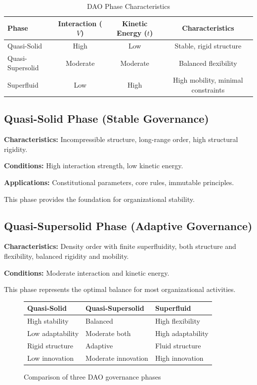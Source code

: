 \documentclass[AMA]{WileyNJD-AMA}
\begin{document}
\begin{table}[h]
\caption{DAO Phase Characteristics}
\label{tab:phases}
\centering
\begin{tabular}{lccc}
\hline
Phase & Interaction ($V$) & Kinetic Energy ($t$) & Characteristics \\
\hline
Quasi-Solid & High & Low & Stable, rigid structure \\
Quasi-Supersolid & Moderate & Moderate & Balanced flexibility \\
Superfluid & Low & High & High mobility, minimal constraints \\
\hline
\end{tabular}
\end{table}

\subsection{Quasi-Solid Phase (Stable Governance)}

\textbf{Characteristics:} Incompressible structure, long-range order, high structural rigidity.

\textbf{Conditions:} High interaction strength, low kinetic energy.

\textbf{Applications:} Constitutional parameters, core rules, immutable principles.

This phase provides the foundation for organizational stability.

\subsection{Quasi-Supersolid Phase (Adaptive Governance)}

\textbf{Characteristics:} Density order with finite superfluidity, both structure and flexibility, balanced rigidity and mobility.

\textbf{Conditions:} Moderate interaction and kinetic energy.

This phase represents the optimal balance for most organizational activities.

\begin{figure}[h]
\centering
\begin{minipage}{0.9\textwidth}
\begin{tabular}{p{2.5in}p{2.5in}p{2.5in}}
\hline
\textbf{Quasi-Solid} & \textbf{Quasi-Supersolid} & \textbf{Superfluid} \\
\hline
High stability & Balanced & High flexibility \\
Low adaptability & Moderate both & High adaptability \\
Rigid structure & Adaptive & Fluid structure \\
Low innovation & Moderate innovation & High innovation \\
\hline
\end{tabular}
\end{minipage}
\caption{Comparison of three DAO governance phases}
\label{fig:phase_comparison}
\end{figure}
\end{document}
